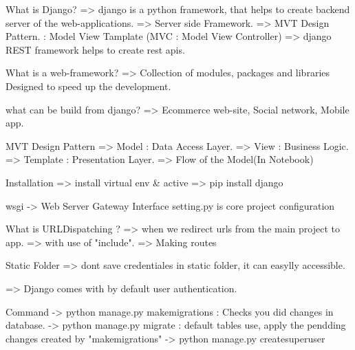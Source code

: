 What is Django?
=> django is a python framework, that helps to create backend server of the web-applications.
=> Server side Framework.
=> MVT Design Pattern. : Model View Tamplate
(MVC : Model View Controller)
=> django REST framework helps to create rest apis.

What is a web-framework?
=> Collection of modules, packages and libraries Designed to speed up the development.

what can be build from django?
=> Ecommerce web-site, Social network, Mobile app.

MVT Design Pattern 
=> Model : Data Access Layer.
=> View : Business Logic.
=> Template : Presentation Layer.
=> Flow of the Model(In Notebook)

Installation
=> install virtual env & active
=> pip install django

wsgi -> Web Server Gateway Interface
setting.py is core project configuration 

What is URLDispatching ?
=> when we redirect urls from the main project to app.
=> with use of "include".
=> Making routes

Static Folder
=> dont save credentiales in static folder, it can easylly accessible.

=> Django comes with by default user authentication.

Command
-> python manage.py makemigrations : Checks you did changes in database.
-> python manage.py migrate : default tables use, apply the pendding changes created by "makemigrations"
-> python manage.py createsuperuser